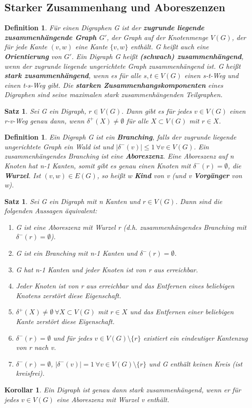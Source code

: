 \documentclass[12pt,a4paper]{article}
\theoremstyle{plain}
\newtheorem{Satz}[Theorem]{Satz}
\newtheorem{Korollar}[Theorem]{Korollar}
\newtheorem{Definition}[Theorem]{Definition}
\newcommand{\herv}[1]{{\emph{\textbf{#1}}}}
\numberwithin{equation}{section}
\begin{document}
\subsection{Starker Zusammenhang und Aboreszenzen}
\begin{Definition}
Für einen Digraphen G ist der \herv{zugrunde liegende zusammenhängende Graph $G'$}, der Graph auf der Knotenmenge $V(G)$, der für jede Kante $(v,w)$ eine Kante $\{v,w\}$ enthält. G heißt auch eine \herv{Orientierung} von $G'$. Ein Digraph G heißt \herv{(schwach) zusammenhängend}, wenn der zugrunde liegende ungerichtete Graph zusammenhängend ist. G heißt \herv{stark zusammenhängend}, wenn es für alle $s,t\in V(G)$ einen s-t-Weg und einen t-s-Weg gibt. Die \herv{starken Zusammenhangskomponenten} eines Digraphen sind seine maximalen stark zusammenhängenden Teilgraphen.
\end{Definition}
\begin{Satz}
Sei G ein Digraph, $r\in V(G)$. Dann gibt es für jedes $v\in V(G)$ einen r-v-Weg genau dann, wenn $\delta^+(X)\neq \emptyset$ für alle $X\subset V(G)$ mit $r\in X$.
\end{Satz}
\begin{Definition}
Ein Digraph G ist ein \herv{Branching}, falls der zugrunde liegende ungerichtete Graph ein Wald ist und $|\delta^-(v)|\leq 1\ \forall v\in V(G)$. Ein zusammenhängendes Branching ist eine \herv{Aboreszenz}. Eine Aboreszenz auf n Knoten hat n-1 Kanten, somit gibt es genau einen Knoten mit $\delta^-(r)=\emptyset$, die \herv{Wurzel}. Ist $(v,w)\in E(G)$, so heißt w \herv{Kind} von v (und v \herv{Vorgänger} von w).
\end{Definition}
\begin{Satz}
Sei G ein Digraph mit n Kanten und $r\in V(G)$. Dann sind die folgenden Aussagen äquivalent:
\renewcommand{\labelenumi}{\emph{(\alph{enumi})}}
\begin{enumerate}
\item G ist eine Aboreszenz mit Wurzel r (d.h. zusammenhängendes Branching mit $\delta^-(r)=\emptyset$).
\item G ist ein Branching mit n-1 Kanten und $\delta^-(r)=\emptyset$.
\item G hat n-1 Kanten und jeder Knoten ist von r aus erreichbar.
\item Jeder Knoten ist von r aus erreichbar und das Entfernen eines beliebigen Knotens zerstört diese Eigenschaft.
\item $\delta^+(X)\neq\emptyset\ \forall X\subset V(G)$ mit $r\in X$ und das Entfernen einer beliebigen Kante zerstört diese Eigenschaft.
\item $\delta^-(r)=\emptyset$ und für jedes $v\in V(G)\setminus \{r\}$ existiert ein eindeutiger Kantenzug von r nach v.
\item $\delta^-(r)=\emptyset$, $|\delta^-(v)|=1\ \forall v\in V(G)\setminus\{r\}$ und G enthält keinen Kreis (ist kreisfrei).
\end{enumerate}
\end{Satz}
\begin{Korollar}
Ein Digraph ist genau dann stark zusammenhängend, wenn er für jedes $v\in V(G)$ eine Aboreszenz mit Wurzel v enthält.
\end{Korollar}
\end{document}
